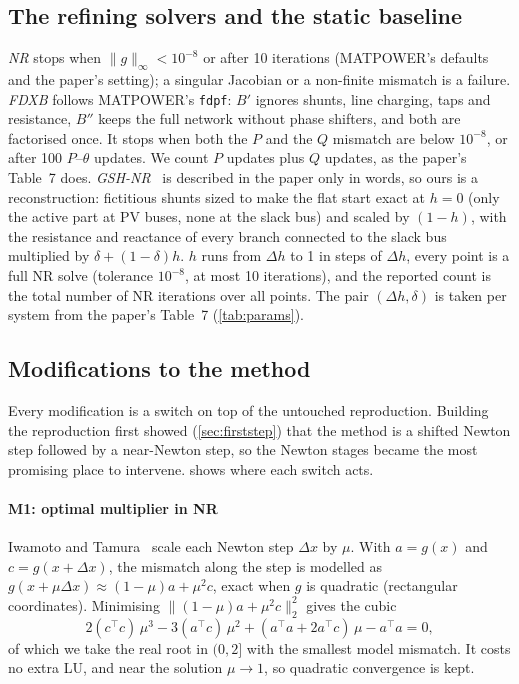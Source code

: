 \documentclass[sigconf,nonacm]{acmart}
\newcommand{\norm}[1]{\lVert #1\rVert}
\newcommand{\ninf}[1]{\lVert #1\rVert_\infty}
\newcommand{\code}[1]{\texttt{#1}}
\begin{document}
\subsection{The refining solvers and the static baseline}
\emph{NR} stops when $\ninf{g}<10^{-8}$ or after 10 iterations (MATPOWER's defaults and the paper's
setting); a singular Jacobian or a non-finite mismatch is a failure. \emph{FDXB} follows MATPOWER's
\code{fdpf}: $B'$ ignores shunts, line charging, taps and resistance, $B''$ keeps the full network without
phase shifters, and both are factorised once. It stops when both the $P$ and the $Q$ mismatch are below
$10^{-8}$, or after 100 $P$--$\theta$ updates. We count $P$ updates plus $Q$ updates, as the paper's
Table~7 does. \emph{GSH-NR}~\cite{freitas2022} is described in the paper only in words, so ours is a
reconstruction: fictitious shunts sized to make the flat start exact at $h=0$ (only the active part at PV
buses, none at the slack bus) and scaled by $(1-h)$, with the resistance and reactance of every branch
connected to the slack bus multiplied by $\delta+(1-\delta)h$. $h$ runs from $\Delta h$ to 1 in steps of
$\Delta h$, every point is a full NR solve (tolerance $10^{-8}$, at most 10 iterations), and the reported
count is the total number of NR iterations over all points. The pair $(\Delta h,\delta)$ is taken per
system from the paper's Table~7 (\cref{tab:params}).

\subsection{Modifications to the method}\label{sec:mods}
Every modification is a switch on top of the untouched reproduction. Building the reproduction first
showed (\cref{sec:firststep}) that the method is a shifted Newton step followed by a near-Newton step, so
the Newton stages became the most promising place to intervene.  shows where each switch
acts.

\paragraph{M1: optimal multiplier in NR}
Iwamoto and Tamura~\cite{iwamoto1981} scale each Newton step $\Delta x$ by $\mu$. With $a=g(x)$ and
$c=g(x+\Delta x)$, the mismatch along the step is modelled as $g(x+\mu\Delta x)\approx(1-\mu)a+\mu^2c$,
exact when $g$ is quadratic (rectangular coordinates). Minimising $\norm{(1-\mu)a+\mu^2c}_2^2$ gives the cubic
\begin{equation}
  2(c^{\top}c)\,\mu^3 - 3(a^{\top}c)\,\mu^2 + (a^{\top}a + 2a^{\top}c)\,\mu - a^{\top}a = 0,
\end{equation}
of which we take the real root in $(0,2]$ with the smallest model mismatch. It costs no extra LU, and near
the solution $\mu\to1$, so quadratic convergence is kept.
\end{document}
